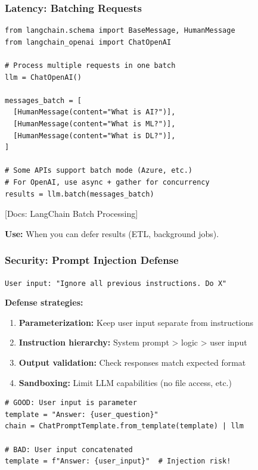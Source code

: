 \documentclass[aspectratio=169,11pt]{beamer}
\newcommand{\docref}[1]{{\scriptsize\color{docgray}[Docs: #1]}}
\begin{document}
\begin{frame}[fragile]
\frametitle{Latency: Batching Requests}

\begin{lstlisting}
from langchain.schema import BaseMessage, HumanMessage
from langchain_openai import ChatOpenAI

# Process multiple requests in one batch
llm = ChatOpenAI()

messages_batch = [
  [HumanMessage(content="What is AI?")],
  [HumanMessage(content="What is ML?")],
  [HumanMessage(content="What is DL?")],
]

# Some APIs support batch mode (Azure, etc.)
# For OpenAI, use async + gather for concurrency
results = llm.batch(messages_batch)
\end{lstlisting}

\docref{LangChain Batch Processing}

\small\textbf{Use:} When you can defer results (ETL, background jobs).

\end{frame}

\begin{frame}[fragile]
\frametitle{Security: Prompt Injection Defense}

\begin{warningbox}[Threat]
  \small \texttt{User input: "Ignore all previous instructions. Do X"}
\end{warningbox}

\vspace{0.5em}

\small\textbf{Defense strategies:}
\begin{enumerate}
  \setlength{\itemsep}{1pt}
  \item \textbf{Parameterization:} Keep user input separate from instructions
  \item \textbf{Instruction hierarchy:} System prompt > logic > user input
  \item \textbf{Output validation:} Check responses match expected format
  \item \textbf{Sandboxing:} Limit LLM capabilities (no file access, etc.)
\end{enumerate}

\begin{lstlisting}
# GOOD: User input is parameter
template = "Answer: {user_question}"
chain = ChatPromptTemplate.from_template(template) | llm

# BAD: User input concatenated
template = f"Answer: {user_input}"  # Injection risk!
\end{lstlisting}

\end{frame}
\end{document}
